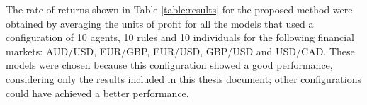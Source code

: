 The rate of returns shown in Table \ref{table:results} for the proposed method
were obtained by averaging the units of profit for all the models that used a
configuration of 10 agents, 10 rules and 10 individuals for the following
financial markets: AUD/USD, EUR/GBP, EUR/USD, GBP/USD and USD/CAD. These models
were chosen because this configuration showed a good performance, considering
only the results included in this thesis document; other configurations could
have achieved a better performance.